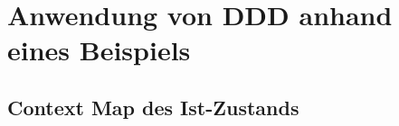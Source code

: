\chapter{Anwendung von DDD anhand eines Beispiels}\label{chp:anw}

\section{Context Map des Ist-Zustands}\label{chp:ist}